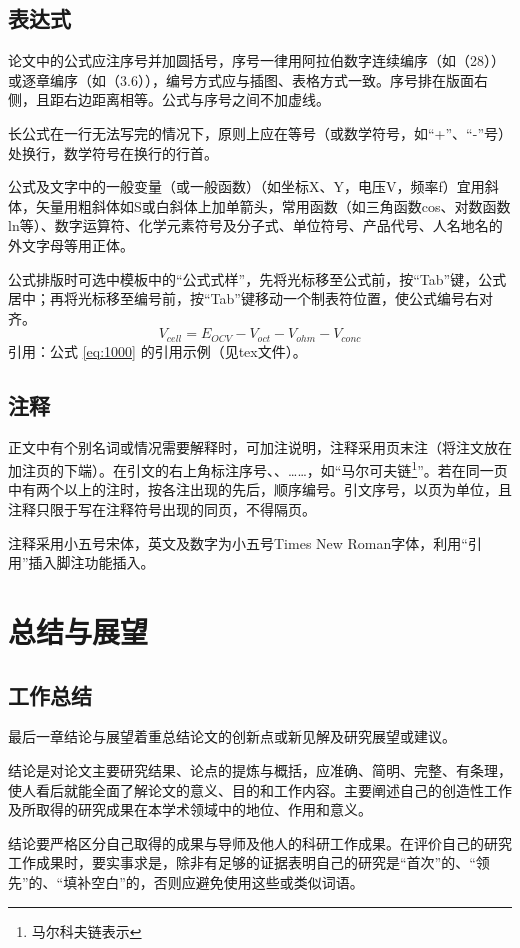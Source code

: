 \documentclass{seuthesis-2022}
\numberwithin{equation}{section}
\begin{document}
\section{表达式}
论文中的公式应注序号并加圆括号，序号一律用阿拉伯数字连续编序（如（28））或逐章编序（如（3.6）），编号方式应与插图、表格方式一致。序号排在版面右侧，且距右边距离相等。公式与序号之间不加虚线。

长公式在一行无法写完的情况下，原则上应在等号（或数学符号，如“+”、“-”号）处换行，数学符号在换行的行首。

公式及文字中的一般变量（或一般函数）（如坐标X、Y，电压V，频率f）宜用斜体，矢量用粗斜体如S或白斜体上加单箭头，常用函数（如三角函数cos、对数函数ln等）、数字运算符、化学元素符号及分子式、单位符号、产品代号、人名地名的外文字母等用正体。

公式排版时可选中模板中的“公式式样”，先将光标移至公式前，按“Tab”键，公式居中；再将光标移至编号前，按“Tab”键移动一个制表符位置，使公式编号右对齐。
\begin{equation}\label{eq:1000}
  V_{cell}=E_{OCV}-V_{oct}-V_{ohm}-V_{conc}
  \end{equation}
引用：公式 \eqref{eq:1000} 的引用示例（见tex文件）。

  
\section{注释}
正文中有个别名词或情况需要解释时，可加注说明，注释采用页末注（将注文放在加注页的下端）。在引文的右上角标注序号、、……，如“马尔可夫链\footnote{马尔科夫链表示}”。若在同一页中有两个以上的注时，按各注出现的先后，顺序编号。引文序号，以页为单位，且注释只限于写在注释符号出现的同页，不得隔页。

注释采用小五号宋体，英文及数字为小五号Times New Roman字体，利用“引用”插入脚注功能插入。

\chapter{总结与展望}
\section{工作总结}
最后一章结论与展望着重总结论文的创新点或新见解及研究展望或建议。

结论是对论文主要研究结果、论点的提炼与概括，应准确、简明、完整、有条理，使人看后就能全面了解论文的意义、目的和工作内容。主要阐述自己的创造性工作及所取得的研究成果在本学术领域中的地位、作用和意义。

结论要严格区分自己取得的成果与导师及他人的科研工作成果。在评价自己的研究工作成果时，要实事求是，除非有足够的证据表明自己的研究是“首次”的、“领先”的、“填补空白”的，否则应避免使用这些或类似词语。
\end{document}

